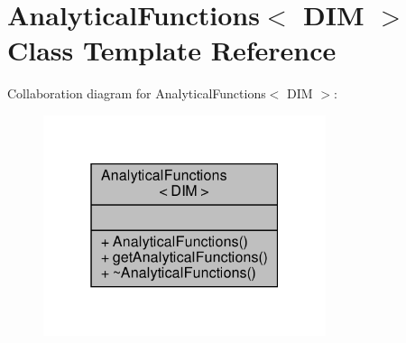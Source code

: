 \hypertarget{classAnalyticalFunctions}{}\section{Analytical\+Functions$<$ D\+IM $>$ Class Template Reference}
\label{classAnalyticalFunctions}


Collaboration diagram for Analytical\+Functions$<$ D\+IM $>$\+:\nopagebreak
\begin{figure}[H]
\begin{center}
\leavevmode
\includegraphics[width=235pt]{classAnalyticalFunctions__coll__graph}
\end{center}
\end{figure}

